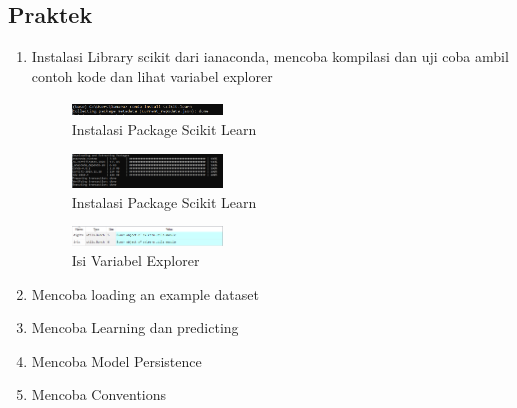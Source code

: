 \subsection{Praktek}
\begin{enumerate}
	\item Instalasi Library scikit dari ianaconda, mencoba kompilasi dan uji coba ambil contoh kode dan lihat variabel explorer
	\hfill\break
	\begin{figure}[H]
		\includegraphics[width=4cm]{figures/1174012/1/ins1.PNG}
		\centering
		\caption{Instalasi Package Scikit Learn}
	\end{figure}
    \begin{figure}[H]
		\includegraphics[width=4cm]{figures/1174012/1/ins2.PNG}
		\centering
		\caption{Instalasi Package Scikit Learn}
	\end{figure}
	\begin{figure}[H]
		\includegraphics[width=4cm]{figures/1174012/1/variabel.png}
		\centering
		\caption{Isi Variabel Explorer}
	\end{figure}
	\item Mencoba loading an example dataset
	\hfill\break
	
	\item Mencoba Learning dan predicting
	\hfill\break
	
	\item Mencoba Model Persistence
	\hfill\break
	
	\item Mencoba Conventions
	\hfill\break
	
\end{enumerate}
